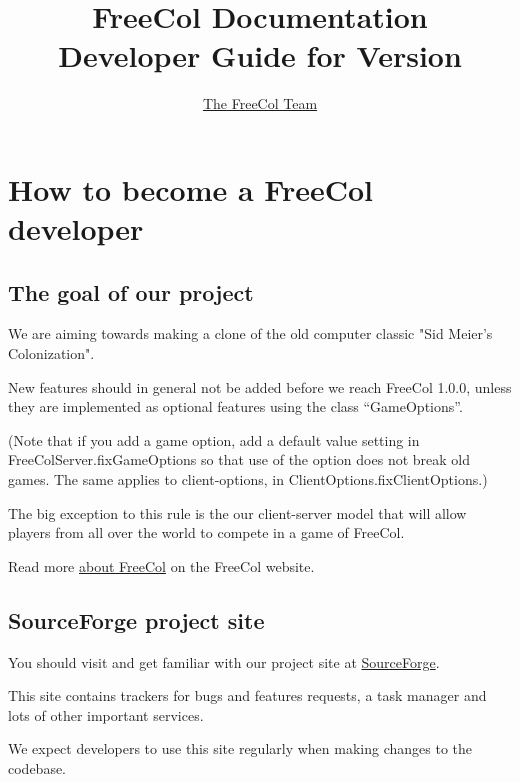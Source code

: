 \documentclass[12pt]{book}
\begin{document}
\author{\href{http://www.freecol.org/team-and-credits.html}{The FreeCol Team}}
\title{FreeCol Documentation\\Developer Guide for Version \fcversion}
\maketitle{}

\tableofcontents
\newpage


\hypertarget{How to become a FreeCol developer}
            {\chapter{How to become a FreeCol developer}}


\hypertarget{The goal of our project}{\section{The goal of our project}}

We are aiming towards making a clone of the old computer
classic "Sid Meier's Colonization".

New features should in general not be added before we reach
FreeCol 1.0.0, unless they are implemented as optional features
using the class ``GameOptions''.

(Note that if you add a game option, add a default value setting in
FreeColServer.fixGameOptions so that use of the option does not break
old games. The same applies to client-options,
in ClientOptions.fixClientOptions.)

The big exception to this rule is the our client-server model that
will allow players from all over the world to compete in a game
of FreeCol.

Read more \href{http://www.freecol.org/about.html}{about FreeCol} on the
FreeCol website.


\hypertarget{SourceForge project site}{\section{SourceForge project site}}

You should visit and get familiar with our project site at
\href{https://sourceforge.net/projects/freecol/}{SourceForge}.

This site contains trackers for bugs and features requests,
a task manager and lots of other important services.

We expect developers to use this site regularly when making
changes to the codebase.
\end{document}
